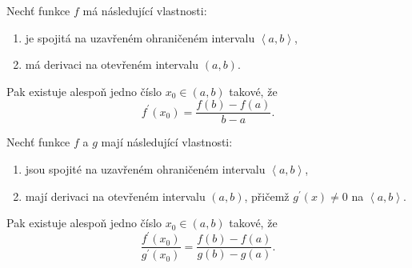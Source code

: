 \begin{veta}
Nechť funkce $f$ má následující vlastnosti:
\begin{enumerate}[$i.$]
\item je spojitá na uzavřeném ohraničeném intervalu $\left < a,b \right > $,
\item má derivaci na otevřeném intervalu $(a,b)$.
\end{enumerate}
Pak existuje alespoň jedno číslo $x_0\in (a,b)$ takové, že
$$f^\prime(x_0)=\frac{f(b)-f(a)}{b-a}.$$
\end{veta}

\begin{veta}
Nechť funkce $f$ a $g$ mají následující vlastnosti:
\begin{enumerate}[$i.$]
\item jsou spojité na uzavřeném ohraničeném intervalu $\left < a,b \right > $,
\item mají derivaci na otevřeném intervalu $(a,b)$, přičemž $g^\prime(x)\ne 0$ na $\left < a,b \right > $.
\end{enumerate}
Pak existuje alespoň jedno číslo $x_0\in (a,b)$ takové, že
$$\frac{f^\prime(x_0)}{g^\prime(x_0)}=\frac{f(b)-f(a)}{g(b)-g(a)}.$$
\end{veta}
